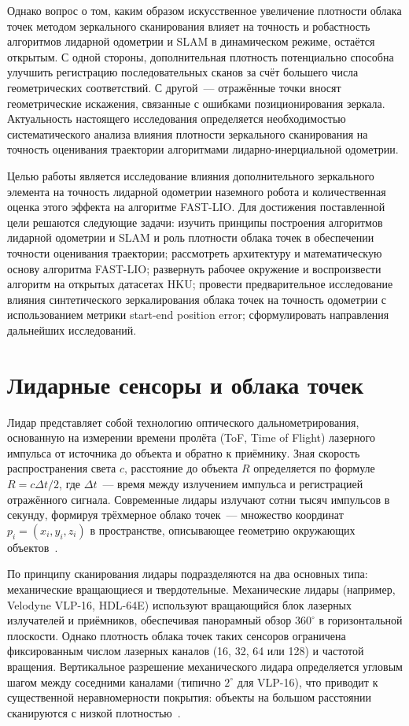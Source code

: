 \documentclass{misisarticle}
\begin{document}
Однако вопрос о том, каким образом искусственное увеличение плотности облака точек методом зеркального сканирования влияет на точность и робастность алгоритмов лидарной одометрии и SLAM в динамическом режиме, остаётся открытым. С одной стороны, дополнительная плотность потенциально способна улучшить регистрацию последовательных сканов за счёт большего числа геометрических соответствий. С другой~--- отражённые точки вносят геометрические искажения, связанные с ошибками позиционирования зеркала. Актуальность настоящего исследования определяется необходимостью систематического анализа влияния плотности зеркального сканирования на точность оценивания траектории алгоритмами лидарно-инерциальной одометрии.

Целью работы является исследование влияния дополнительного зеркального элемента на точность лидарной одометрии наземного робота и количественная оценка этого эффекта на алгоритме FAST-LIO. Для достижения поставленной цели решаются следующие задачи: изучить принципы построения алгоритмов лидарной одометрии и SLAM и роль плотности облака точек в обеспечении точности оценивания траектории; рассмотреть архитектуру и математическую основу алгоритма FAST-LIO; развернуть рабочее окружение и воспроизвести алгоритм на открытых датасетах HKU; провести предварительное исследование влияния синтетического зеркалирования облака точек на точность одометрии с использованием метрики start-end position error; сформулировать направления дальнейших исследований.

\section{Лидарные сенсоры и облака точек}

Лидар представляет собой технологию оптического дальнометрирования, основанную на измерении времени пролёта (ToF, Time of Flight) лазерного импульса от источника до объекта и обратно к приёмнику. Зная скорость распространения света $c$, расстояние до объекта $R$ определяется по формуле $R = c\Delta t/2$, где $\Delta t$~--- время между излучением импульса и регистрацией отражённого сигнала. Современные лидары излучают сотни тысяч импульсов в секунду, формируя трёхмерное облако точек~--- множество координат $p_i=(x_i,y_i,z_i)$ в пространстве, описывающее геометрию окружающих объектов~\cite{beraldin2010}.

По принципу сканирования лидары подразделяются на два основных типа: механические вращающиеся и твердотельные. Механические лидары (например, Velodyne VLP-16, HDL-64E) используют вращающийся блок лазерных излучателей и приёмников, обеспечивая панорамный обзор $360^\circ$ в горизонтальной плоскости. Однако плотность облака точек таких сенсоров ограничена фиксированным числом лазерных каналов (16, 32, 64 или 128) и частотой вращения. Вертикальное разрешение механического лидара определяется угловым шагом между соседними каналами (типично $2^\circ$ для VLP-16), что приводит к существенной неравномерности покрытия: объекты на большом расстоянии сканируются с низкой плотностью~\cite{vishnevsky2026,beraldin2010,yoo2018}.
\end{document}
